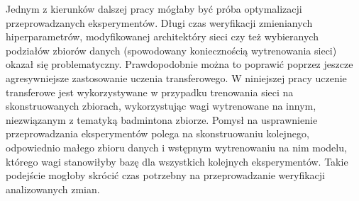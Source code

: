 Jednym z kierunków dalszej pracy mógłaby być próba optymalizacji przeprowadzanych eksperymentów. Długi czas weryfikacji zmienianych hiperparametrów, modyfikowanej architektóry sieci czy też wybieranych podziałów zbiorów danych (spowodowany koniecznością wytrenowania sieci) okazał się problematyczny. Prawdopodobnie można to poprawić poprzez jeszcze agresywniejsze zastosowanie uczenia transferowego. W niniejszej pracy uczenie transferowe jest wykorzystywane w przypadku trenowania sieci na skonstruowanych zbiorach, wykorzystując wagi wytrenowane na innym, niezwiązanym z tematyką badmintona zbiorze. Pomysł na usprawnienie przeprowadzania eksperymentów polega na skonstruowaniu kolejnego, odpowiednio małego zbioru danych i wstępnym wytrenowaniu na nim modelu, którego wagi stanowiłyby bazę dla wszystkich kolejnych eksperymentów. Takie podejście mogłoby skrócić czas potrzebny na przeprowadzanie weryfikacji analizowanych zmian.
